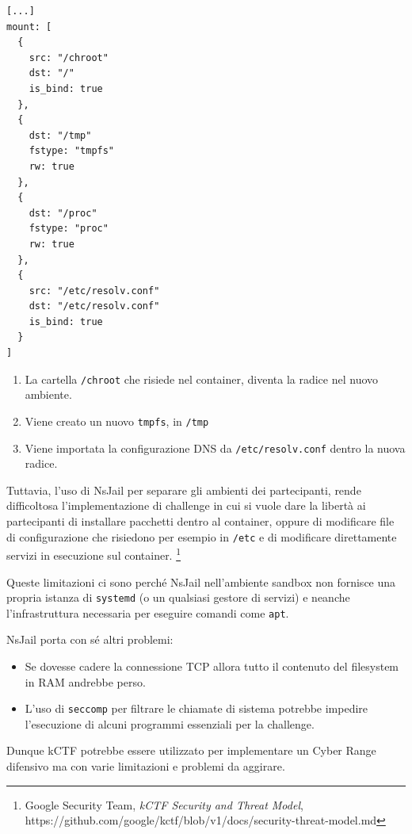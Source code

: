 \begin{lstlisting}
[...]
mount: [
  {
    src: "/chroot"
    dst: "/"
    is_bind: true
  },
  {
    dst: "/tmp"
    fstype: "tmpfs"
    rw: true
  },
  {
    dst: "/proc"
    fstype: "proc"
    rw: true
  },
  {
    src: "/etc/resolv.conf"
    dst: "/etc/resolv.conf"
    is_bind: true
  }
]
\end{lstlisting}

\begin{enumerate}
\def\labelenumi{\arabic{enumi}.}
\tightlist
\item
  La cartella \passthrough{\lstinline!/chroot!} che risiede nel
  container, diventa la radice nel nuovo ambiente.
\item
  Viene creato un nuovo \passthrough{\lstinline!tmpfs!}, in
  \passthrough{\lstinline!/tmp!}
\item
  Viene importata la configurazione DNS da
  \passthrough{\lstinline!/etc/resolv.conf!} dentro la nuova radice.
\end{enumerate}

Tuttavia, l'uso di NsJail per separare gli ambienti dei partecipanti,
rende difficoltosa l'implementazione di challenge in cui si vuole dare
la libertà ai partecipanti di installare pacchetti dentro al container,
oppure di modificare file di configurazione che risiedono per esempio in
\passthrough{\lstinline!/etc!} e di modificare direttamente servizi in
esecuzione sul container. \footnote{\label{fn:ref_6}Google Security Team, \emph{kCTF
  Security and Threat Model},
  https://github.com/google/kctf/blob/v1/docs/security-threat-model.md}

Queste limitazioni ci sono perché NsJail nell'ambiente sandbox non
fornisce una propria istanza di \passthrough{\lstinline!systemd!} (o un
qualsiasi gestore di servizi) e neanche l'infrastruttura necessaria per
eseguire comandi come \passthrough{\lstinline!apt!}.

NsJail porta con sé altri problemi:

\begin{itemize}
\tightlist
\item
  Se dovesse cadere la connessione TCP allora tutto il contenuto del
  filesystem in RAM andrebbe perso.
\item
  L'uso di \passthrough{\lstinline!seccomp!} per filtrare le chiamate di
  sistema potrebbe impedire l'esecuzione di alcuni programmi essenziali
  per la challenge.
\end{itemize}

Dunque kCTF potrebbe essere utilizzato per implementare un Cyber Range
difensivo ma con varie limitazioni e problemi da aggirare.

